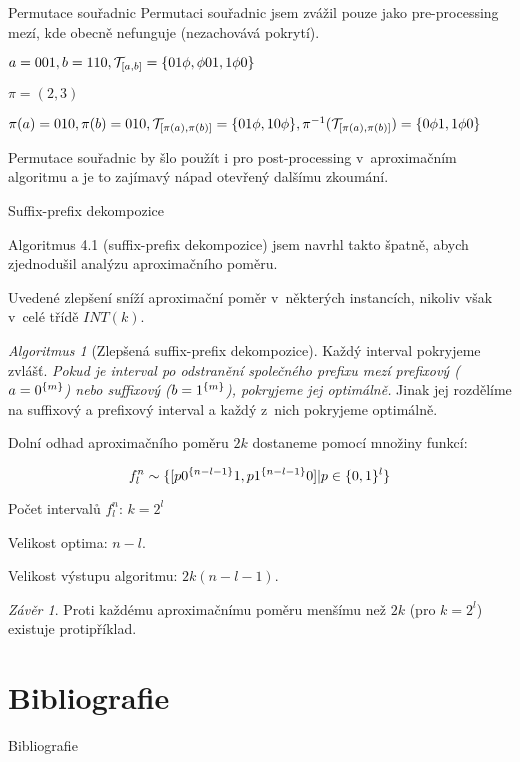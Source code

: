 \documentclass{beamer}
\theoremstyle{remark}
\newtheorem{algorithm}{Algoritmus}
\newtheorem{conclusion}{Závěr}
\begin{document}
\begin{frame}{Permutace souřadnic}
Permutaci souřadnic jsem zvážil pouze jako pre-processing mezí, kde obecně nefunguje (nezachovává pokrytí).

\begin{example}
$a = 001, b = 110, \mathcal{T}_{[a, b]} = \{01 \phi, \phi 01, 1 \phi 0\}$

$\pi = (2,3)$

$\pi(a) = 010, \pi(b) = 010,
\mathcal{T}_{[\pi(a), \pi(b)]} = \{01 \phi, 10 \phi\},
\pi^{-1}(\mathcal{T}_{[\pi(a), \pi(b)]}) = \{0 \phi 1, 1 \phi 0\}$
\end{example}

Permutace souřadnic by šlo použít i pro post-processing v~aproximačním algoritmu a je to zajímavý nápad otevřený dalšímu zkoumání.

\end{frame}

\begin{frame}{Suffix-prefix dekompozice}

Algoritmus 4.1 (suffix-prefix dekompozice) jsem navrhl takto špatně, abych zjednodušil analýzu aproximačního poměru.

Uvedené zlepšení sníží aproximační poměr v~některých instancích, nikoliv však v~celé třídě $INT(k)$.

\begin{algorithm}[Zlepšená suffix-prefix dekompozice]
Každý interval pokryjeme zvlášť.
\emph{Pokud je interval po odstranění společného prefixu mezí prefixový ($a = 0^{\{m\}}$) nebo suffixový ($b = 1^{\{m\}}$), pokryjeme jej optimálně.}
Jinak jej rozdělíme na suffixový a prefixový interval a každý z~nich pokryjeme optimálně.
\end{algorithm}


Dolní odhad aproximačního poměru $2k$ dostaneme pomocí množiny  funkcí:

$$
f_l^n \sim \{[p 0^{\{n-l-1\}} 1, p 1^{\{n-l-1\}} 0] | p \in \{0, 1\}^l\}
$$

Počet intervalů $f_l^n$: $k = 2^l$

Velikost optima: $n-l$.

Velikost výstupu algoritmu: $2k (n-l-1)$.

\begin{conclusion}
Proti každému aproximačnímu poměru menšímu než $2k$ (pro $k = 2^l$) existuje protipříklad.
\end{conclusion}
\end{frame}

\section{Bibliografie}

\begin{frame}{Bibliografie}

\end{frame}
\end{document}
